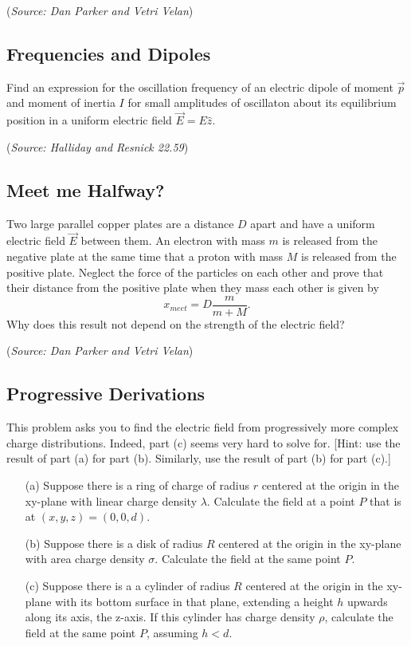\documentclass{article}
\begin{document}
(\textit{Source: Dan Parker and Vetri Velan})

\subsection{Frequencies and Dipoles}

Find an expression for the oscillation frequency of an electric dipole of moment $\vec{p}$ and moment of inertia $I$ for small amplitudes of oscillaton about its equilibrium position in a uniform electric field $\vec{E} = E \hat{z}$.

(\textit{Source: Halliday and Resnick 22.59})

\subsection{Meet me Halfway?}

Two large parallel copper plates are a distance $D$ apart and have a uniform electric field $\vec{E}$ between them. An electron with mass $m$ is released from the negative plate at the same time that a proton with mass $M$ is released from the positive plate. Neglect the force of the particles on each other and prove that their distance from the positive plate when they mass each other is given by
\begin{equation}
x_{meet} = D\frac{m}{m+M}.
\end{equation}
Why does this result not depend on the strength of the electric field?

(\textit{Source: Dan Parker and Vetri Velan})

\subsection{Progressive Derivations}

This problem asks you to find the electric field from progressively more complex charge distributions. Indeed, part (c) seems very hard to solve for. [Hint: use the result of part (a) for part (b). Similarly, use the result of part (b) for part (c).]
\begin{itemize}
	\item[(a)] Suppose there is a ring of charge of radius $r$ centered at the origin in the xy-plane with linear charge density $\lambda$. Calculate the field at a point $P$ that is at $(x,y,z)=(0,0,d)$.
	\item[(b)] Suppose there is a disk of radius $R$ centered at the origin in the xy-plane with area charge density $\sigma$. Calculate the field at the same point $P$.
	\item[(c)] Suppose there is a a cylinder of radius $R$ centered at the origin in the xy-plane with its bottom surface in that plane, extending a height $h$ upwards along its axis, the z-axis. If this cylinder has charge density $\rho$, calculate the field at the same point $P$, assuming $h<d$.
\end{itemize}
\end{document}
